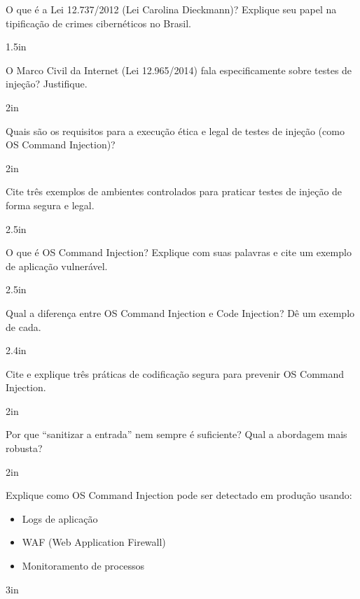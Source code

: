 \documentclass[12pt]{exam}
\begin{document}
\begin{questions}

\question O que é a Lei 12.737/2012 (Lei Carolina Dieckmann)? Explique seu papel na tipificação de crimes cibernéticos no Brasil.
\begin{solutionbox}{1.5in}
\end{solutionbox}

\question O Marco Civil da Internet (Lei 12.965/2014) fala especificamente sobre testes de injeção? Justifique.
\begin{solutionbox}{2in}
\end{solutionbox}

\question Quais são os requisitos para a execução ética e legal de testes de injeção (como OS Command Injection)?
\begin{solutionbox}{2in}
\end{solutionbox}

\question Cite três exemplos de ambientes controlados para praticar testes de injeção de forma segura e legal.
\begin{solutionbox}{2.5in}
\end{solutionbox}

\question O que é OS Command Injection? Explique com suas palavras e cite um exemplo de aplicação vulnerável.
\begin{solutionbox}{2.5in}
\end{solutionbox}

\question Qual a diferença entre OS Command Injection e Code Injection? Dê um exemplo de cada.
\begin{solutionbox}{2.4in}
\end{solutionbox}

\question Cite e explique três práticas de codificação segura para prevenir OS Command Injection.
\begin{solutionbox}{2in}
\end{solutionbox}

\question Por que ``sanitizar a entrada'' nem sempre é suficiente? Qual a abordagem mais robusta?
\begin{solutionbox}{2in}
\end{solutionbox}

\question Explique como OS Command Injection pode ser detectado em produção usando:
\begin{itemize}
\item Logs de aplicação
\item WAF (Web Application Firewall)
\item Monitoramento de processos
\end{itemize}
\begin{solutionbox}{3in}
\end{solutionbox}

\end{questions}
\end{document}
